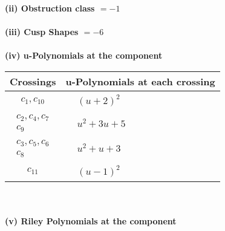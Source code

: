 \documentclass[1p]{elsarticle_modified}
\theoremstyle{definition}
\begin{document}
\flushleft \textbf{(ii) Obstruction class $= -1$}\\~\\
\flushleft \textbf{(iii) Cusp Shapes $= -6$}\\~\\
\newpage\renewcommand{\arraystretch}{1}
\flushleft \textbf{(iv) u-Polynomials at the component}\newline \\
\begin{tabular}{m{50pt}|m{274pt}}
Crossings & \hspace{64pt}u-Polynomials at each crossing \\
\hline $$\begin{aligned}c_{1},c_{10}\end{aligned}$$&$\begin{aligned}
&(u+2)^2
\end{aligned}$\\
\hline $$\begin{aligned}c_{2},c_{4},c_{7}\\c_{9}\end{aligned}$$&$\begin{aligned}
&u^2+3 u+5
\end{aligned}$\\
\hline $$\begin{aligned}c_{3},c_{5},c_{6}\\c_{8}\end{aligned}$$&$\begin{aligned}
&u^2+u+3
\end{aligned}$\\
\hline $$\begin{aligned}c_{11}\end{aligned}$$&$\begin{aligned}
&(u-1)^2
\end{aligned}$\\
\hline
\end{tabular}\\~\\
\newpage\renewcommand{\arraystretch}{1}
\flushleft \textbf{(v) Riley Polynomials at the component}\newline \\
\end{document}
